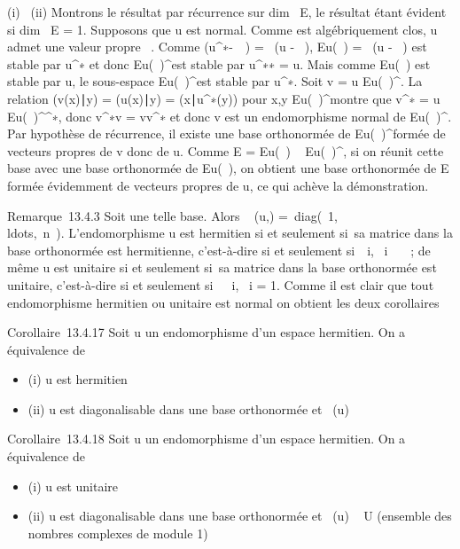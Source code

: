 (i) \rigtharrow~(ii) Montrons le résultat par récurrence sur
dim~ E, le résultat étant évident si
dim~ E = 1. Supposons que u est normal. Comme 
est algébriquement clos, u admet une valeur propre \lambda~. Comme
\mathrmKer(u^∗-\overline\lambda~\mathrmIdE~)
= \mathrmKer~(u -
\lambda~\mathrmIdE), Eu(\lambda~)
= \mathrmKer~(u -
\lambda~\mathrmIdE) est stable par u^∗
et donc Eu(\lambda~)^\bot est stable par u^∗∗ = u.
Mais comme Eu(\lambda~) est stable par u, le sous-espace
Eu(\lambda~)^\bot est stable par u^∗. Soit v =
u\textbar{} Eu(\lambda~)^\bot. La
relation (v(x)∣y) =
(u(x)∣y) =
(x∣u^∗(y)) pour x,y \in
Eu(\lambda~)^\bot montre que v^∗ =
u\textbar{} Eu(\lambda~)^\bot^∗,
donc v^∗v = vv^∗ et donc v est un endomorphisme
normal de Eu(\lambda~)^\bot. Par hypothèse de récurrence, il
existe une base orthonormée de Eu(\lambda~)^\bot formée de
vecteurs propres de v donc de u. Comme E = Eu(\lambda~) \bot \oplus~
Eu(\lambda~)^\bot, si on réunit cette base avec une base
orthonormée de Eu(\lambda~), on obtient une base orthonormée de E
formée évidemment de vecteurs propres de u, ce qui achève la
démonstration.

Remarque~13.4.3 Soit  une telle base. Alors
\mathrmMat~ (u,)
=\
diag(\lambda~1,\\ldots,\lambda~n~).
L'endomorphisme u est hermitien si et seulement si~sa matrice dans la
base orthonormée \mathcal{E} est hermitienne, c'est-à-dire si et seulement
si~\forall~i, \lambda~i~ \in \mathbb{R}~~; de même u est
unitaire si et seulement si~sa matrice dans la base orthonormée  est
unitaire, c'est-à-dire si et seulement si~\forall~~i,
\textbar{}\lambda~i\textbar{} = 1. Comme il est clair que tout
endomorphisme hermitien ou unitaire est normal on obtient les deux
corollaires

Corollaire~13.4.17 Soit u un endomorphisme d'un espace hermitien. On a
équivalence de

\begin{itemize}
\itemsep1pt\parskip0pt
\item
  (i) u est hermitien
\item
  (ii) u est diagonalisable dans une base orthonormée et
  ~(u) \subset~ ~
\end{itemize}

Corollaire~13.4.18 Soit u un endomorphisme d'un espace hermitien. On a
équivalence de

\begin{itemize}
\itemsep1pt\parskip0pt
\item
  (i) u est unitaire
\item
  (ii) u est diagonalisable dans une base orthonormée et
  ~(u) \subset~ U
  (ensemble des nombres complexes de module 1)
\end{itemize}

